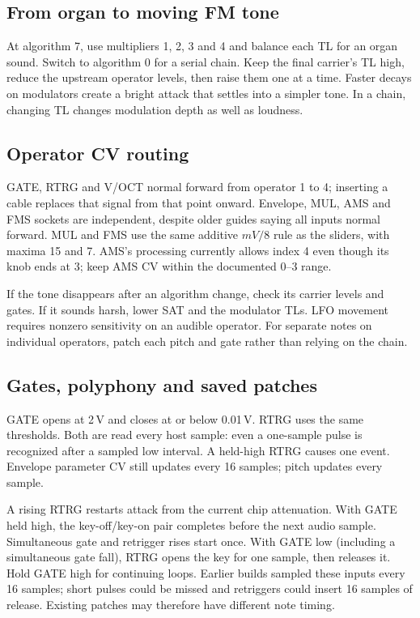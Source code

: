 \subsection{From organ to moving FM tone}
At algorithm 7, use multipliers 1, 2, 3 and 4 and balance each TL for an organ
sound. Switch to algorithm 0 for a serial chain. Keep the final carrier's TL
high, reduce the upstream operator levels, then raise them one at a time.
Faster decays on modulators create a bright attack that settles into a simpler
tone. In a chain, changing TL changes modulation depth as well as loudness.

\subsection{Operator CV routing}
GATE, RTRG and V/OCT normal forward from operator 1 to 4; inserting a cable
replaces that signal from that point onward. Envelope, MUL, AMS and FMS
sockets are independent, despite older guides saying all inputs normal forward.
MUL and FMS use the same additive $mV/8$ rule as the sliders, with maxima
15 and 7. AMS's processing currently allows index 4 even though its knob
ends at 3; keep AMS CV within the documented 0--3 range.

If the tone disappears after an algorithm change, check its carrier levels
and gates. If it sounds harsh, lower SAT and the modulator TLs. LFO movement
requires nonzero sensitivity on an audible operator. For separate notes on
individual operators, patch each pitch and gate rather than relying on the chain.

\subsection{Gates, polyphony and saved patches}
GATE opens at 2\,V and closes at or below 0.01\,V. RTRG uses the same
thresholds. Both are read every host sample: even a one-sample pulse is
recognized after a sampled low interval. A held-high RTRG causes one event.
Envelope parameter CV still updates every 16 samples; pitch updates every sample.

A rising RTRG restarts attack from the current chip attenuation. With GATE
held high, the key-off/key-on pair completes before the next audio sample.
Simultaneous gate and retrigger rises start once. With GATE low (including a
simultaneous gate fall), RTRG opens the key for one sample, then releases it.
Hold GATE high for continuing loops. Earlier builds sampled these inputs
every 16 samples; short pulses could be missed and retriggers could insert
16 samples of release. Existing patches may therefore have different note timing.

